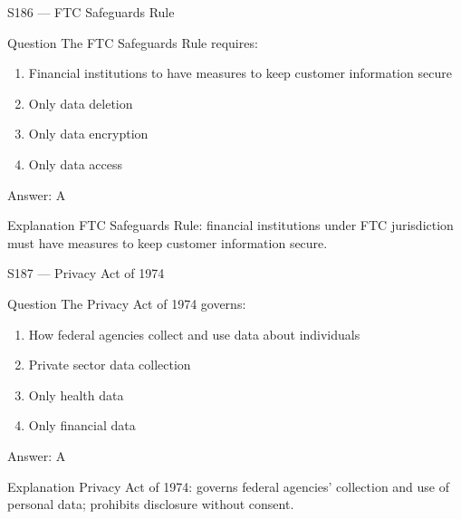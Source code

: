 \documentclass[aspectratio=169,8pt]{beamer}
\begin{document}
\begin{frame}{S186 --- FTC Safeguards Rule}
	\begin{block}{Question}
		The FTC Safeguards Rule requires:
		\begin{enumerate}
			\item Financial institutions to have measures to keep customer information secure
			\item Only data deletion
			\item Only data encryption
			\item Only data access
		\end{enumerate}
	\end{block}
	\begin{exampleblock}{Answer: A}\end{exampleblock}
	\begin{block}{Explanation}
		FTC Safeguards Rule: financial institutions under FTC jurisdiction must have measures to keep customer information secure.
	\end{block}
\end{frame}

\begin{frame}{S187 --- Privacy Act of 1974}
	\begin{block}{Question}
		The Privacy Act of 1974 governs:
		\begin{enumerate}
			\item How federal agencies collect and use data about individuals
			\item Private sector data collection
			\item Only health data
			\item Only financial data
		\end{enumerate}
	\end{block}
	\begin{exampleblock}{Answer: A}\end{exampleblock}
	\begin{block}{Explanation}
		Privacy Act of 1974: governs federal agencies' collection and use of personal data; prohibits disclosure without consent.
	\end{block}
\end{frame}
\end{document}
